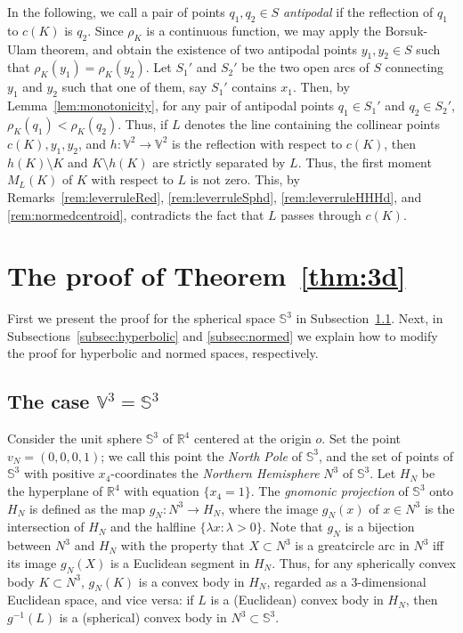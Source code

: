 \documentclass[twoside]{amsart}
\theoremstyle{plain}
\theoremstyle{definition}
\numberwithin{equation}{section}
\renewcommand{\Re}{\mathbb R}
\newcommand{\Sph}{\mathbb{S}}
\newcommand{\V}{\mathbb{V}}
\begin{document}
In the following, we call a pair of points $q_1, q_2 \in S$ \emph{antipodal} if the reflection of $q_1$ to $c(K)$ is $q_2$. Since $\rho_K$ is a continuous function, we may apply the Borsuk-Ulam theorem, and obtain the existence of two antipodal points $y_1,y_2 \in S$ such that $\rho_K(y_1)= \rho_K(y_2)$.  Let $S_1'$ and $S_2'$ be the two open arcs of $S$ connecting $y_1$ and $y_2$ such that one of them, say $S_1'$ contains $x_1$. Then, by Lemma~\ref{lem:monotonicity}, for any pair of antipodal points $q_1 \in S_1'$ and $q_2 \in S_2'$, $\rho_K(q_1) < \rho_K(q_2)$. Thus, if $L$ denotes the line containing the collinear points $c(K), y_1, y_2$, and $h : \V^2 \to \V^2$ is the reflection with respect to $c(K)$, then $h(K) \setminus K$ and $K \setminus h(K)$ are strictly separated by $L$. Thus, the first moment $M_L(K)$ of $K$ with respect to $L$ is not zero. This, by Remarks~\ref{rem:leverruleRed}, \ref{rem:leverruleSphd}, \ref{rem:leverruleHHHd}, and \ref{rem:normedcentroid}, contradicts the fact that $L$ passes through $c(K)$.





\section{The proof of Theorem~\ref{thm:3d}}\label{sec:3d}

First we present the proof for the spherical space $\Sph^3$ in Subsection~\ref{subsec:spherical}. Next, in Subsections~\ref{subsec:hyperbolic} and \ref{subsec:normed} we explain how to modify the proof for hyperbolic and normed spaces, respectively.

\subsection{The case $\V^3 = \Sph^3$}\label{subsec:spherical}

Consider the unit sphere $\Sph^3$ of $\Re^4$ centered at the origin $o$. Set the point $v_N = (0,0,0,1)$; we call this point the \emph{North Pole} of $\Sph^3$, and the set of points of $\Sph^3$ with positive $x_4$-coordinates the \emph{Northern Hemisphere} $N^3$ of $\Sph^3$. Let $H_N$ be the hyperplane of $\Re^4$ with equation $\{ x_4 = 1 \}$. The \emph{gnomonic projection} of $\Sph^3$ onto $H_N$ is defined as the map $g_N : N^3 \to H_N$, where the image $g_N(x)$ of $x \in N^3$ is the intersection of $H_N$ and the halfline $\{ \lambda x : \lambda > 0 \}$. Note that $g_N$ is a bijection between $N^3$ and $H_N$ with the property that $X \subset N^3$ is a greatcircle arc in $N^3$ iff its image $g_N(X)$ is a Euclidean segment in $H_N$. Thus, for any spherically convex body $K \subset N^3$, $g_N(K)$ is a convex body in $H_N$, regarded as a $3$-dimensional Euclidean space, and vice versa: if $L$ is a (Euclidean) convex body in $H_N$, then $g^{-1}(L)$ is a (spherical) convex body in $N^3 \subset \Sph^3$.
\end{document}
